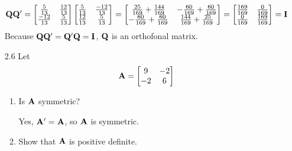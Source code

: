 \begin{enumerate}[font=\bfseries]
        \[
            \bold{Q} \bold{Q}^\prime = 
            \begin{bmatrix}
                \frac{5}{13} & \frac{12}{13} \\
                \frac{-12}{13} & \frac{5}{13}
            \end{bmatrix}
            \begin{bmatrix}
                \frac{5}{13} & \frac{-12}{13} \\
                \frac{12}{13} & \frac{5}{13}
            \end{bmatrix} =
            \begin{bmatrix}
                \frac{25}{169} + \frac{144}{169} & -\frac{60}{169} + \frac{60}{169} \\
                -\frac{60}{169} + \frac{60}{169} & \frac{144}{169} + \frac{25}{169}
            \end{bmatrix} =
            \begin{bmatrix}
                \frac{169}{169} & \frac{0}{169} \\
                \frac{0}{169} & \frac{169}{169}
            \end{bmatrix} =
            \bold{I}
        \]
        Because $\bold{Q}\bold{Q}^\prime = \bold{Q}^\prime \bold{Q} = \bold{I}$, $\bold{Q}$ is an orthofonal matrix.
        \item[2.6] Let
        \[
            \bold{A} = \begin{bmatrix}
                9 & -2 \\
                -2 & 6
            \end{bmatrix}
        \]
        \begin{enumerate}
            \item Is $\bold{A}$ symmetric?
            \par
            Yes, $\bold{A}^{\prime} = \bold{A}$, so $\bold{A}$ is symmetric.
            \item Show that $\bold{A}$ is positive definite.
            

\end{enumerate}
\end{enumerate}

